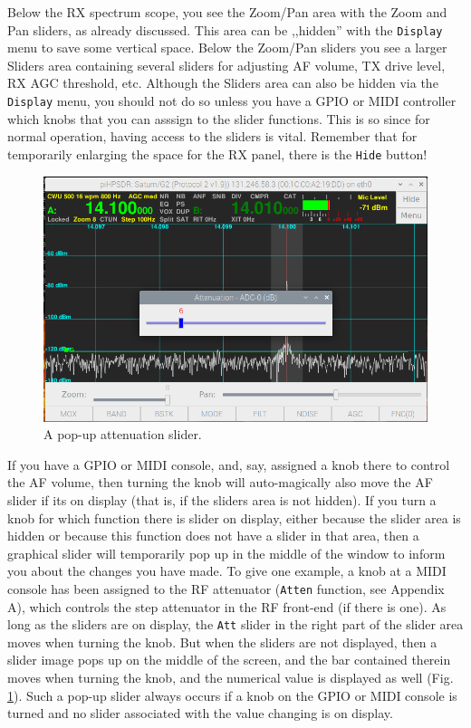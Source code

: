 \documentclass[12pt]{book}
\def\rett#1{\texttt{\color{red}#1}}
\def\bltt#1{\texttt{\color{blue}#1}}
\begin{document}
Below the RX  spectrum scope, you see the Zoom/Pan area with
the  Zoom and Pan sliders, as already discussed. This area
can be ,,hidden'' with the \bltt{Display} menu to save some
vertical space. Below the
Zoom/Pan sliders you see a larger  Sliders area containing
several sliders for adjusting AF volume, TX  drive level, 
RX  AGC threshold, etc. Although the Sliders area can also
be hidden via the \bltt{Display} menu, you should not do so
unless you have a GPIO or MIDI controller which knobs that
you can asssign to the slider functions. This is so since
for  normal operation, having access to the sliders is vital.
Remember that for temporarily enlarging the space for
the RX  panel, there is the \rett{Hide} button!

\begin{figure}
\center
\includegraphics[width=12cm]{SliderOnScreen.png}
\caption{A pop-up attenuation slider.}
\label{fig:SliderOnScreen}
\end{figure}

If you have a GPIO or  MIDI  console, and, say, assigned
a knob there to control the AF volume, then turning the
knob will auto-magically also move the AF slider if its
on display (that is, if the sliders area is not hidden).
If you turn a knob for which function there is slider
on display, either because the slider area is hidden or
because this function does not have a slider in that area,
then a graphical slider will temporarily pop up in the
middle of the window to inform you about the changes 
you have  made. To give one example, a knob at a
MIDI console has been assigned to the RF attenuator (\bltt{Atten}
function, see Appendix A), which controls the step 
attenuator in the RF front-end (if there is one). As long
as the  sliders  are  on display, the \rett{Att} slider
in the right part of the slider area moves when turning
the knob. But when the sliders are not displayed, then a slider image
pops up  on the middle of the screen, and the
bar contained therein moves when turning the knob,
and the numerical value is displayed as well (Fig. \ref{fig:SliderOnScreen}).
Such a pop-up slider always occurs if a knob on the GPIO or MIDI
console is turned and no slider associated with the value changing is
on display.
\end{document}
